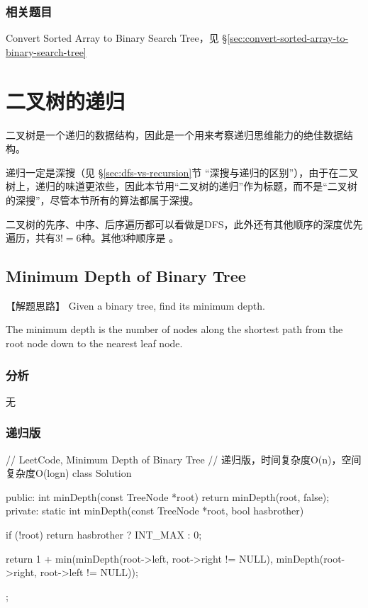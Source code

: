 \subsubsection{相关题目}
\begindot
\item Convert Sorted Array to Binary Search Tree，见 \S \ref{sec:convert-sorted-array-to-binary-search-tree}
\myenddot


\section{二叉树的递归} %
二叉树是一个递归的数据结构，因此是一个用来考察递归思维能力的绝佳数据结构。

递归一定是深搜（见 \S \ref{sec:dfs-vs-recursion}节 “深搜与递归的区别”），由于在二叉树上，递归的味道更浓些，因此本节用“二叉树的递归”作为标题，而不是“二叉树的深搜”，尽管本节所有的算法都属于深搜。

二叉树的先序、中序、后序遍历都可以看做是DFS，此外还有其他顺序的深度优先遍历，共有$3!=6$种。其他3种顺序是 。


\subsection{Minimum Depth of Binary Tree}
\label{sec:minimum-depth-of-binary-tree}


【解题思路】
Given a binary tree, find its minimum depth.

The minimum depth is the number of nodes along the shortest path from the root node down to the nearest leaf node.


\subsubsection{分析}
无


\subsubsection{递归版}
\begin{Code}
	// LeetCode, Minimum Depth of Binary Tree
	// 递归版，时间复杂度O(n)，空间复杂度O(logn)
	class Solution {
		public:
		int minDepth(const TreeNode *root) {
			return minDepth(root, false);
		}
		private:
		static int minDepth(const TreeNode *root, bool hasbrother) {
			if (!root) return hasbrother ? INT_MAX : 0;
			
			return 1 + min(minDepth(root->left, root->right != NULL),
			minDepth(root->right, root->left != NULL));
		}
	};
\end{Code}


